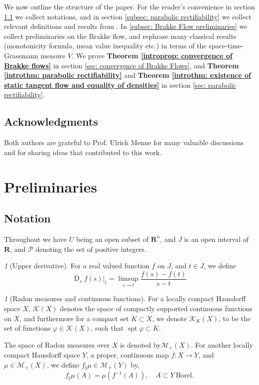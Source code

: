 \documentclass{article}
\theoremstyle{plain}
\theoremstyle{definition}
\theoremstyle{plain}
\theoremstyle{remark}
\newtheorem{propparagraph}[theorem]{}
\theoremstyle{remark}
\theoremstyle{plain}
\DeclareMathOperator{\spt}{spt}
\DeclareMathOperator{\D}{D}
\begin{document}
We now outline the structure of the paper. 
For the reader's convenience in section \ref{subsec: notation} we collect notations, and in section \ref{subsec: parabolic rectifiability} we collect relevant definitions and results from \cite{mattila2021parabolicrectifiabilitytangentplanes}.
In \ref{subsec: Brakke Flow preliminaries} we collect preliminaries on the Brakke flow, and rephrase many classical results (monotonicity formula, mean value inequality etc.) in terms of the space-time-Grassmann measure $V$. 
We prove \textbf{Theorem \ref{introprop: convergence of Brakke flows}} in section \ref{sec: convergence of Brakke Flows}, and \textbf{Theorem \ref{introthm: parabolic rectifiability}} and \textbf{Theorem \ref{introthm: existence of static tangent flow and equality of densities}} in section \ref{sec: parabolic rectifiability}.

\subsection*{Acknowledgments} 

Both authors are grateful to Prof. Ulrich Menne for many valuable discussions and for sharing ideas that contributed to this work.

\section{Preliminaries}

\subsection{Notation}\label{subsec: notation}

Throughout we have $U$ being an open subset of $\mathbf{R}^{n}$, and $J$ is an open interval of $\mathbf{R}$, and $\mathscr{P}$ denoting the set of positive integers.

\begin{propparagraph}[Upper derivative]
    For a real valued function $f$ on $J$, 
    and $t\in J$,
    we define 
\[ \overline{\D}_sf(s)|_t = \limsup\limits_{s\to t} \frac{f(s)-f(t)}{s-t}\]
\end{propparagraph}

\begin{propparagraph}[Radon measures and continuous functions]
    For a locally compact Hausdorff space $X$, $\mathscr{K} (X)$ denotes the space of compactly supported continuous functions on $X$, and furthermore for a compact set $K \subset X$, we denote $\mathscr{K}_{K} (X) $, to be the set of functions $\varphi \in \mathscr{K} (X)$, such that $ \spt \varphi \subset K$. 
    
    The space of Radon measures over $X$ is denoted by$\mathscr{M}_{+} (X)$.
    For another locally compact Hausdorff space $Y$, a proper, continuous map $f \colon X \rightarrow Y$, and $\mu \in \mathscr{M}_{+} (X)$, we define $f_{\sharp} \mu \in \mathscr{M}_{+} (Y)$ by, 
    \begin{equation*}
        \textstyle f_{\sharp} \mu (A) = \mu (f^{-1} (A)), \quad A \subset Y \ \text{Borel}.
    \end{equation*}
\end{propparagraph}
\end{document}
